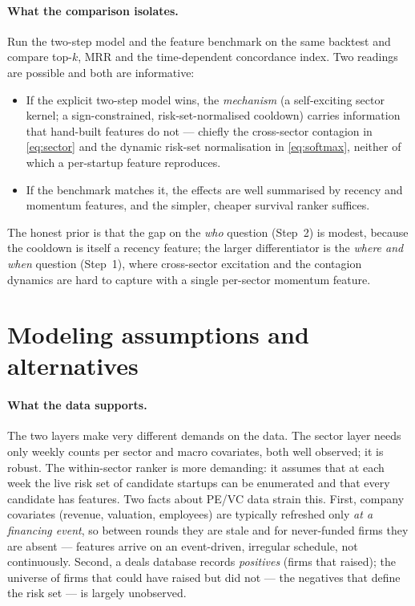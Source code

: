 \documentclass[11pt]{article}
\begin{document}
\paragraph{What the comparison isolates.} Run the two-step model and the feature
benchmark on the same backtest and compare top-$k$, MRR and the time-dependent
concordance index. Two readings are possible and both are informative:
\begin{itemize}[leftmargin=1.4em,itemsep=2pt]
\item If the explicit two-step model wins, the \emph{mechanism} (a self-exciting sector
kernel; a sign-constrained, risk-set-normalised cooldown) carries information that
hand-built features do not --- chiefly the cross-sector contagion in \eqref{eq:sector} and
the dynamic risk-set normalisation in \eqref{eq:softmax}, neither of which a per-startup
feature reproduces.
\item If the benchmark matches it, the effects are well summarised by recency and
momentum features, and the simpler, cheaper survival ranker suffices.
\end{itemize}
The honest prior is that the gap on the \emph{who} question (Step~2) is modest, because
the cooldown is itself a recency feature; the larger differentiator is the \emph{where and
when} question (Step~1), where cross-sector excitation and the contagion dynamics are hard
to capture with a single per-sector momentum feature.

\section{Modeling assumptions and alternatives}
\label{sec:alternatives}

\paragraph{What the data supports.} The two layers make very different demands on the
data. The sector layer needs only weekly counts per sector and macro covariates, both
well observed; it is robust. The within-sector ranker is more demanding: it assumes that
at each week the live risk set of candidate startups can be enumerated and that every
candidate has features. Two facts about PE/VC data strain this. First, company covariates
(revenue, valuation, employees) are typically refreshed only \emph{at a financing event},
so between rounds they are stale and for never-funded firms they are absent --- features
arrive on an event-driven, irregular schedule, not continuously. Second, a deals database
records \emph{positives} (firms that raised); the universe of firms that could have raised
but did not --- the negatives that define the risk set --- is largely unobserved.
\end{document}
